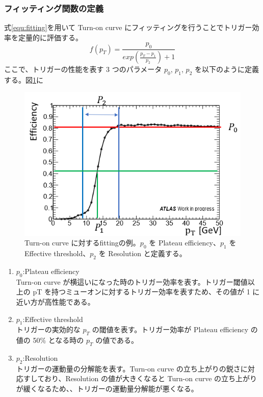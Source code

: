 \subsubsection{フィッティング関数の定義}\label{section:fitting}
式\eqref{equ:fitting}を用いて Turn-on curve にフィッティングを行うことでトリガー効率を定量的に評価する。
\begin{equation}
    f(p_T) = \frac{p_0}{exp(\frac{p_T-p_1}{p_2})+1}
　\label{equ:fitting}
\end{equation}
ここで、トリガーの性能を表す 3 つのパラメータ $p_0$, $p_1$, $p_2$ を以下のように定義する。図\ref{fig:fiting}に
\begin{figure}[tb]
  \centering
  \includegraphics[clip, width=14cm]{fig/4/fitting_def.png}
  \caption{Turn-on curve に対するfittingの例。$p_0$ を Plateau efficiency、$p_1$ を Effective threshold、$p_2$ を Resolution と定義する。}
  \label{fig:fiting}
\end{figure}

\begin{enumerate}\label{table:fitting}
   \item $p_0$:Plateau efficiency\\
   Turn-on curve が横這いになった時のトリガー効率を表す。トリガー閾値以上の pT を持つミューオンに対するトリガー効率を表すため、その値が 1 に近い方が高性能である。
   \item $p_1$:Effective threshold\\
   トリガーの実効的な $p_T$ の閾値を表す。トリガー効率が Plateau efficiency の値の 50\% となる時の $p_T$ の値である。
   \item $p_2$:Resolution\\
   トリガーの運動量の分解能を表す。Turn-on curve の立ち上がりの鋭さに対応すしており、Resolution の値が大きくなると Turn-on curve の立ち上がりが緩くなるため、、トリガーの運動量分解能が悪くなる。
\end{enumerate}

